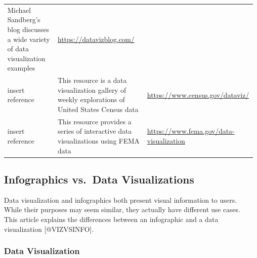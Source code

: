\documentclass[]{book}
\theoremstyle{definition}
\theoremstyle{definition}
\theoremstyle{definition}
\theoremstyle{remark}
\begin{document}
\begin{longtable}[]{@{}lll@{}}
\begin{minipage}[t]{0.28\columnwidth}
Michael Sandberg's blog discusses a wide variety of data visualization
examples\strut
\end{minipage} & \begin{minipage}[t]{0.48\columnwidth}\raggedright\strut
\url{https://datavizblog.com/}\strut
\end{minipage}\tabularnewline
\begin{minipage}[t]{0.15\columnwidth}\raggedright\strut
insert reference\strut
\end{minipage} & \begin{minipage}[t]{0.28\columnwidth}\raggedright\strut
This resource is a data visualization gallery of weekly explorations of
United States Census data\strut
\end{minipage} & \begin{minipage}[t]{0.48\columnwidth}\raggedright\strut
\url{https://www.census.gov/dataviz/}\strut
\end{minipage}\tabularnewline
\begin{minipage}[t]{0.15\columnwidth}\raggedright\strut
insert reference\strut
\end{minipage} & \begin{minipage}[t]{0.28\columnwidth}\raggedright\strut
This resource provides a series of interactive data visualizations using
FEMA data\strut
\end{minipage} & \begin{minipage}[t]{0.48\columnwidth}\raggedright\strut
\url{https://www.fema.gov/data-visualization}\strut
\end{minipage}\tabularnewline
\bottomrule
\end{longtable}

\subsection{Infographics vs.~Data
Visualizations}\label{infographics-vs.data-visualizations}

Data visualization and infographics both present visual information to
users. While their purposes may seem similar, they actually have
different use cases. This article explains the differences between an
infographic and a data visualization {[}@VIZVSINFO{]}.

\subsubsection{Data Visualization}\label{data-visualization}
\end{document}
